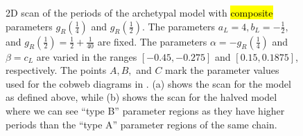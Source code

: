 \begin{figure}
	\centering
	\caption[2D scans of the periods of the archetypal model]{
		2D scan of the periods of the archetypal model with \hl{composite} parameters $g_R\left(\frac{1}{4}\right)$ and $g_R\left(\frac{1}{2}\right)$.
		The parameters $a_L = 4, b_L = -\frac{1}{2},$ and $g_R\left(\frac{1}{2}\right) = \frac{1}{2} + \frac{1}{40}$ are fixed.
		The parameters $\alpha = -g_R\left(\frac{1}{4}\right)$ and $\beta = c_L$ are varied in the ranges $[-0.45, -0.275]$ and $[0.15, 0.1875]$, respectively.
		The points $A, B,$ and $C$ mark the parameter values used for the cobweb diagrams in .
		(a) shows the scan for the model as defined above, while (b) shows the scan for the halved model where we can see ``type B'' parameter regions as they have higher periods than the ``type A'' parameter regions of the same chain.
	}
	\label{fig:setup.arch.period}
\end{figure}

